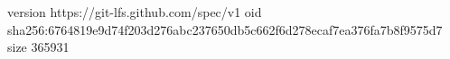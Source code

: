 version https://git-lfs.github.com/spec/v1
oid sha256:6764819e9d74f203d276abc237650db5c662f6d278ecaf7ea376fa7b8f9575d7
size 365931
